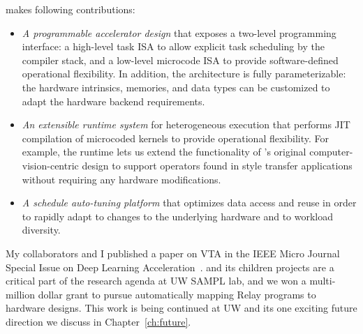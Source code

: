 \vta makes following contributions:

\begin{itemize}
    \item \emph{A programmable accelerator design} that exposes a two-level programming interface: a high-level task ISA to allow explicit task scheduling by the compiler stack, and a low-level microcode ISA to provide software-defined operational flexibility.
    In addition, the \vta architecture is fully parameterizable: the hardware intrinsics, memories, and data types can be customized to adapt the hardware backend requirements.
    \item \emph{An extensible runtime system} for heterogeneous execution that performs JIT compilation of microcoded kernels to provide operational flexibility. For example, the \vta runtime lets us extend the functionality of \vta's original computer-vision-centric design to support operators found in style transfer applications without requiring any hardware modifications.
    \item \emph{A schedule auto-tuning platform} that optimizes data access and reuse in order to rapidly adapt to changes to the underlying hardware and to workload diversity.
\end{itemize}

My collaborators and I published a paper on VTA in
  the IEEE Micro Journal Special Issue on Deep Learning Acceleration~\citep{moreau2018vta}.
\vta and its children projects are a critical part of the research
  agenda at UW SAMPL lab, and we won a multi-million dollar grant to
  pursue automatically mapping Relay programs to hardware designs.
This work is being continued at UW and its one exciting future
  direction we discuss in Chapter~\ref{ch:future}.
